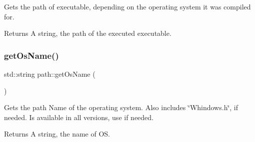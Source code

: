 Gets the path of executable, depending on the operating system it was compiled for. 

\begin{DoxyReturn}{Returns}
A string, the path of the executed executable. 
\end{DoxyReturn}
\mbox{\label{namespacepath_a14ce44304deb85153eb99ce47dec74f5}} 
\subsubsection{\texorpdfstring{get\+Os\+Name()}{getOsName()}}
{\footnotesize\ttfamily std\+::string path\+::get\+Os\+Name (\begin{DoxyParamCaption}{ }\end{DoxyParamCaption})}



Gets the path Name of the operating system. Also includes \char`\"{}\+Whindows.\+h\char`\"{}, if needed. Is available in all versions, use if needed. 

\begin{DoxyReturn}{Returns}
A string, the name of OS. 
\end{DoxyReturn}
